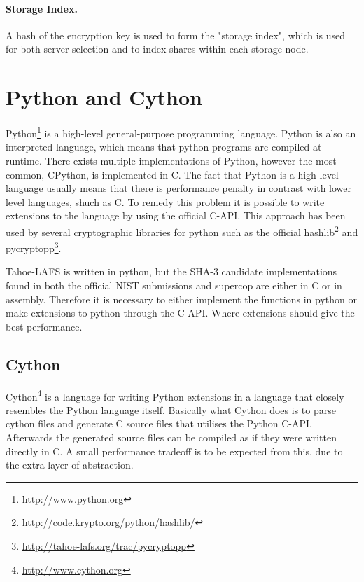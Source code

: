 \documentclass[english,12pt,a4paper]{book}
\begin{document}
\paragraph{Storage Index.}

A hash of the encryption key is used to form the "storage index", which is
used for both server selection and to index shares within each storage node.

\section{Python and Cython}
Python\footnote{\url{http://www.python.org}} is a high-level general-purpose
programming language. Python is also an interpreted language, which means that
python programs are compiled at runtime.  There exists multiple implementations
of Python, however the most common, CPython, is implemented in C. The fact that
Python is a high-level language usually means that there is performance penalty
in contrast with lower level languages, shuch as C. To remedy this problem it
is possible to write extensions to the language by using the official C-API.
This approach has been used by several cryptographic libraries for python such
as the official hashlib\footnote{\url{http://code.krypto.org/python/hashlib/}}
and pycryptopp\footnote{\url{http://tahoe-lafs.org/trac/pycryptopp}}.

Tahoe-\ac{LAFS} is written in python, but the SHA-3 candidate implementations found
in both the official NIST submissions and supercop are either in C or in
assembly. Therefore it is necessary to either implement the functions in python
or make extensions to python through the C-API. Where extensions should give
the best performance. %

\subsection{Cython}
Cython\footnote{\url{http://www.cython.org}} is a language for writing Python
extensions in a language that closely resembles the Python language itself.
Basically what Cython does is to parse cython files and generate C source files
that utilises the Python C-API. Afterwards the generated source files can be
compiled as if they were written directly in C. A small performance tradeoff is
to be expected from this, due to the extra layer of abstraction.
\end{document}
